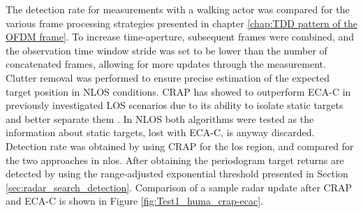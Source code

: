 The detection rate for measurements with a walking actor was compared for the various frame processing strategies presented in chapter \ref{chap:TDD pattern of the OFDM frame}. To increase time-aperture, subsequent frames were combined, and the observation time window stride was set to be lower than the number 
of concatenated frames, allowing for more updates through the measurement.
Clutter removal was performed to ensure precise estimation of the expected target position in NLOS conditions. 
CRAP has showed to outperform ECA-C in previously investigated LOS scenarios due to its ability to isolate static targets and better separate them \cite{Henninger_CRAP_2023}.
In NLOS both algorithms were tested as the information about static targets, lost with ECA-C, is anyway discarded.
Detection rate was obtained by using CRAP for the \gls{los} region, and compared for the two approaches in \gls{nlos}.
After obtaining the periodogram target returns are detected by using the range-adjusted exponential threshold presented in Section \ref{sec:radar_search_detection}.
Comparison of a sample radar update after CRAP and ECA-C is shown in Figure \ref{fig:Test1_huma_crap-ecac}.

